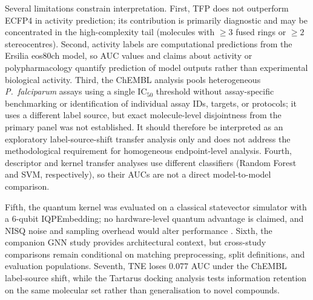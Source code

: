 \documentclass[11pt,a4paper]{article}
\begin{document}
Several limitations constrain interpretation. First, TFP does not outperform ECFP4 in activity prediction; its contribution is primarily diagnostic and may be concentrated in the high-complexity tail (molecules with $\geq 3$ fused rings or $\geq 2$ stereocentres). Second, activity labels are computational predictions from the Ersilia eos80ch model, so AUC values and claims about activity or polypharmacology quantify prediction of model outputs rather than experimental biological activity. Third, the ChEMBL analysis pools heterogeneous \textit{P.~falciparum} assays using a single IC$_{50}$ threshold without assay-specific benchmarking or identification of individual assay IDs, targets, or protocols; it uses a different label source, but exact molecule-level disjointness from the primary panel was not established. It should therefore be interpreted as an exploratory label-source-shift transfer analysis only and does not address the methodological requirement for homogeneous endpoint-level analysis. Fourth, descriptor and kernel transfer analyses use different classifiers (Random Forest and SVM, respectively), so their AUCs are not a direct model-to-model comparison.

Fifth, the quantum kernel was evaluated on a classical statevector simulator with a 6-qubit IQPEmbedding; no hardware-level quantum advantage is claimed, and NISQ noise and sampling overhead would alter performance \citep{preskill2018nisq}. Sixth, the companion GNN study \citep{saognn2026} provides architectural context, but cross-study comparisons remain conditional on matching preprocessing, split definitions, and evaluation populations. Seventh, TNE loses \num{0.077} AUC under the ChEMBL label-source shift, while the Tartarus docking analysis tests information retention on the same molecular set rather than generalisation to novel compounds.
\end{document}
